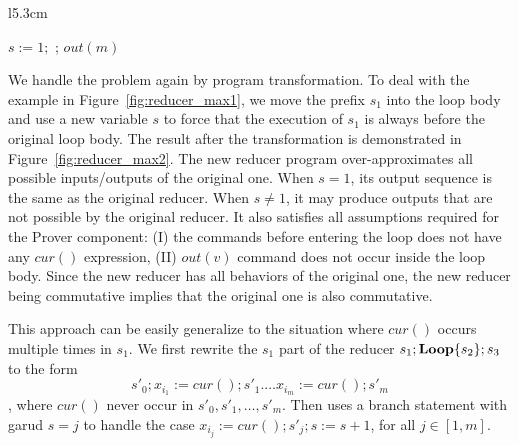 \documentclass{llncs}
\newcommand{\hide}[1]{}
\newcommand{\cur}{cur()}
\newcommand{\rloop}{
	\ifmmode
	\mathbf{Loop}
	\else
	\textbf{Loop}
	\fi}
\begin{document}
\begin{wrapfigure}{l}{5.3cm}
	\vspace{-1cm}
	\begin{algorithm}[H]
		$s:=1;$\;
		\Loop{}{
			\uIf{$s=1$}{$m := \cur + 10; s:= 2$}
			\uElse{
				$t:=\cur$\;
				\uIf{ $t > m$}{
					$m := t$ \;
				}
			}
		};
		$out(m)$
	\end{algorithm}	
	\vspace{-0.4cm}
	\caption{Reducer max$^{+\mathtt{fix}}$}
	\vspace{-0.4cm}
	\label{fig:reducer_max2}
\end{wrapfigure}
We handle the problem again by program transformation. To deal with the example in Figure~\ref{fig:reducer_max1}, we move the prefix $s_1$ into the loop body and use a new variable $s$ to force that the execution of $s_1$ is always before the original loop body. The result after the transformation is demonstrated in Figure~\ref{fig:reducer_max2}. The new reducer program over-approximates all possible inputs/outputs of the original one. When $s=1$, its output sequence is the same as the original reducer. When $s\neq 1$, it may produce outputs that are not possible by the original reducer.
It also satisfies all assumptions required for the Prover component:
(I) the commands before entering the loop does not have any $\cur$ expression,
(II) $out(v)$ command does not occur inside the loop body.
Since the new reducer has all behaviors of the original one, the new reducer being commutative implies that the original one is also commutative.


\hide{
	\begin{wrapfigure}{r}{9cm}
		\centering
		\begin{minipage}{0.8\textwidth}
			
			\begin{algorithm}[H]
				$s'_0;s:=*;$\;
				\Loop{}{
					\lIf{$s=1$}{ $x_{i_1} := \cur; s'_1; s:=2$}
					\lElseIf{ $s =2$}{ $x_{i_2} := \cur; s'_2; s:=3$}
					\lElseIf{ $s = 3$}{$\ldots$}
					\lElseIf{ $s = m$}{$x_{i_m} := \cur; s'_m; s:=m+1$}
					\lElse{ $s_2$}
				};$s_3$\;
			\end{algorithm}
		\end{minipage}
		\caption{The second transformation task}
		\label{fig:general_program_transformation}
\end{wrapfigure}}


This approach can be easily generalize to the situation where $\cur$ occurs multiple times in $s_1$. We first rewrite the $s_1$ part of the reducer $s_1;\rloop\{s_2\};s_3$ to the form
$$s'_0;x_{i_1}{:=} \cur;s'_1.\ldots x_{i_{m}}{:=}\cur;s'_m$$, where $\cur$ never occur in $s'_0,s'_1,\ldots, s'_m$. Then uses a branch statement with garud $s=j$ to handle the case $x_{i_j} := \cur; s'_j; s:=s+1$, for all $j \in [1,m]$.
\end{document}
